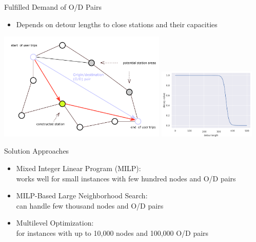 \documentclass[aspectratio=1610]{beamer}
\newcommand{\important}[1]{{\color{green!60!black}#1}}
\begin{document}
\begin{frame}{Fulfilled Demand of O/D Pairs}
\begin{itemize}
	\item Depends on \important{detour lengths} to close stations and their \important{capacities}
\end{itemize}
\begin{center}
	\includegraphics[width=0.6\textwidth]{graphics/graph_third.pdf}
	\includegraphics[width=0.35\textwidth]{graphics/decay.pdf}
\end{center}
\end{frame}

\begin{frame}{Solution Approaches}
	\begin{itemize}
		\itemsep3ex
		\item \important{Mixed Integer Linear Program (MILP)}:\\ works well for small instances with \alert{few hundred} nodes and O/D pairs
		\item \important{MILP-Based Large Neighborhood Search}:\\ can handle \alert{few thousand} nodes and O/D pairs
		\item \important{Multilevel Optimization}:\\ for instances with \alert{up to 10,000 nodes and 100,000 O/D pairs}
	\end{itemize}
\end{frame}
\end{document}
